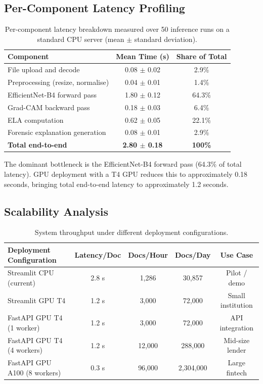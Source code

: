 \documentclass[12pt,a4paper,oneside]{report}
\begin{document}
\subsection{Per-Component Latency Profiling}

\begin{table}[H]
\centering
\caption{Per-component latency breakdown measured over 50 inference runs on a
standard CPU server (mean $\pm$ standard deviation).}
\label{tab:latency_full}
\renewcommand{\arraystretch}{1.3}
\begin{tabular}{lcc}
\toprule
\textbf{Component} & \textbf{Mean Time (s)} & \textbf{Share of Total} \\
\midrule
File upload and decode           & 0.08 $\pm$ 0.02 & 2.9\% \\
Preprocessing (resize, normalise) & 0.04 $\pm$ 0.01 & 1.4\% \\
EfficientNet-B4 forward pass     & 1.80 $\pm$ 0.12 & 64.3\% \\
Grad-CAM backward pass           & 0.18 $\pm$ 0.03 & 6.4\% \\
ELA computation                  & 0.62 $\pm$ 0.05 & 22.1\% \\
Forensic explanation generation  & 0.08 $\pm$ 0.01 & 2.9\% \\
\midrule
\textbf{Total end-to-end}        & \textbf{2.80 $\pm$ 0.18} & \textbf{100\%} \\
\bottomrule
\end{tabular}
\end{table}

The dominant bottleneck is the EfficientNet-B4 forward pass (64.3\% of total
latency). GPU deployment with a T4 GPU reduces this to approximately 0.18 seconds,
bringing total end-to-end latency to approximately 1.2 seconds.

\subsection{Scalability Analysis}

\begin{table}[H]
\centering
\caption{System throughput under different deployment configurations.}
\label{tab:scalability}
\renewcommand{\arraystretch}{1.3}
\begin{tabular}{p{4.5cm}cccc}
\toprule
\textbf{Deployment Configuration} & \textbf{Latency/Doc} & \textbf{Docs/Hour} & \textbf{Docs/Day} & \textbf{Use Case} \\
\midrule
Streamlit CPU (current)       & 2.8 s  & 1,286   & 30,857   & Pilot / demo \\
Streamlit GPU T4              & 1.2 s  & 3,000   & 72,000   & Small institution \\
FastAPI GPU T4 (1 worker)     & 1.2 s  & 3,000   & 72,000   & API integration \\
FastAPI GPU T4 (4 workers)    & 1.2 s  & 12,000  & 288,000  & Mid-size lender \\
FastAPI GPU A100 (8 workers)  & 0.3 s  & 96,000  & 2,304,000 & Large fintech \\
\bottomrule
\end{tabular}
\end{table}
\end{document}
